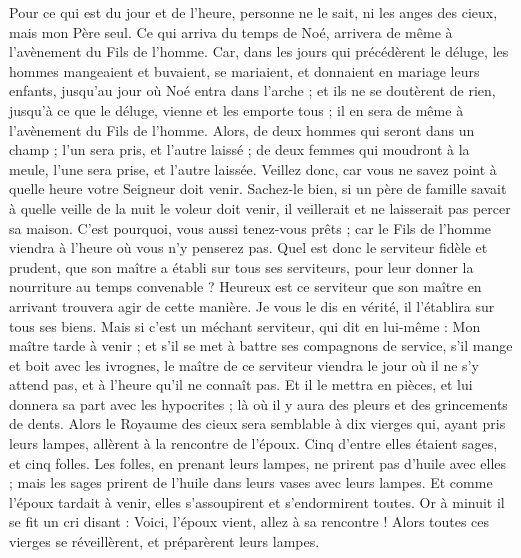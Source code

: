 \begin{multicols}{2}
Pour ce qui est du jour et de l’heure, personne ne le sait, ni les anges des cieux, mais mon Père seul.
Ce qui arriva du temps de Noé, arrivera de même à l'avènement du Fils de l'homme.
Car, dans les jours qui précédèrent le déluge, les hommes mangeaient et buvaient, se mariaient, et donnaient en mariage leurs enfants, jusqu'au jour où Noé entra dans l'arche ;
et ils ne se doutèrent de rien, jusqu’à ce que le déluge, vienne et les emporte tous ; il en sera de même à l'avènement du Fils de l'homme.
Alors, de deux hommes qui seront dans un champ ; l'un sera pris, et l'autre laissé ;
de deux femmes qui moudront à la meule, l'une sera prise, et l'autre laissée.
Veillez donc, car vous ne savez point à quelle heure votre Seigneur doit venir.
Sachez-le bien, si un père de famille savait à quelle veille de la nuit le voleur doit venir, il veillerait et ne laisserait pas percer sa maison.
C'est pourquoi, vous aussi tenez-vous prêts ; car le Fils de l'homme viendra à l'heure où vous n'y penserez pas.
Quel est donc le serviteur fidèle et prudent, que son maître a établi sur tous ses serviteurs, pour leur donner la nourriture au temps convenable ?
Heureux est ce serviteur que son maître en arrivant trouvera agir de cette manière.
Je vous le dis en vérité, il l'établira sur tous ses biens.
Mais si c'est un méchant serviteur, qui dit en lui-même : Mon maître tarde à venir ;
et s’il se met à battre ses compagnons de service, s’il mange et boit avec les ivrognes,
le maître de ce serviteur viendra le jour où il ne s’y attend pas, et à l'heure qu'il ne connaît pas.
Et il le mettra en pièces, et lui donnera sa part avec les hypocrites ; là où il y aura des pleurs et des grincements de dents.
\VerseOne{}Alors le Royaume des cieux sera semblable à dix vierges qui, ayant pris leurs lampes, allèrent à la rencontre de l'époux.
Cinq d’entre elles étaient sages, et cinq folles.
Les folles, en prenant leurs lampes, ne prirent pas d'huile avec elles ;
mais les sages prirent de l'huile dans leurs vases avec leurs lampes.
Et comme l'époux tardait à venir, elles s’assoupirent et s'endormirent toutes.
Or à minuit il se fit un cri disant : Voici, l'époux vient, allez à sa rencontre !
Alors toutes ces vierges se réveillèrent{}, et préparèrent leurs lampes.

\end{multicols}
